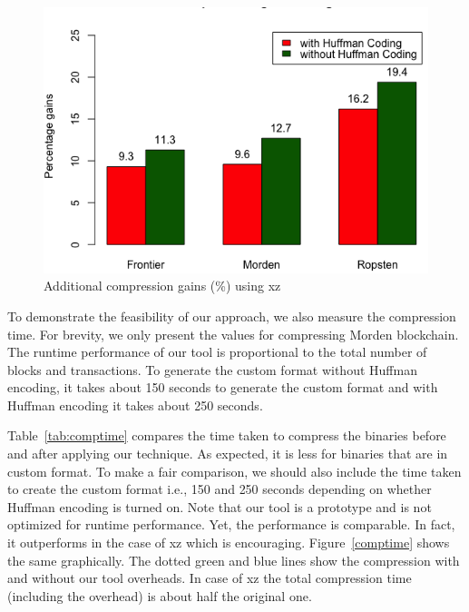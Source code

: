 \begin{figure}
	\includegraphics[scale=0.45]{plots/xz}
	\caption{Additional compression gains (\%) using xz}
	\label{fig:xz}
\end{figure}

To demonstrate the feasibility of our approach, we also measure the compression time. 
For brevity, we only 
present the values for compressing Morden blockchain.
The runtime performance of our tool is proportional to the total number of blocks and transactions. 
To generate the custom format without Huffman encoding, it takes about 150 seconds to generate the custom format and with Huffman encoding it takes about 250 seconds. 


Table~\ref{tab:comptime} compares the time taken to compress the binaries before and after applying our technique. As expected, it is less for binaries that are in custom format. 
To make a fair comparison, we should also include the time taken to create the custom format i.e., 150 and 250 seconds depending on whether Huffman encoding is turned on.
Note that our tool is a prototype and is not optimized for runtime performance. 
Yet, the performance is comparable. 
In fact, it outperforms in the case of xz which is encouraging.
Figure~\ref{comptime} shows the same graphically. The dotted green and blue lines show the compression with and without our tool
overheads. In case of xz the total compression time (including the overhead) is about half the original one.


